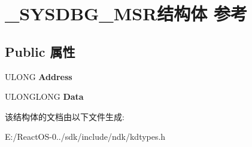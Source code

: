 \hypertarget{struct___s_y_s_d_b_g___m_s_r}{}\section{\+\_\+\+S\+Y\+S\+D\+B\+G\+\_\+\+M\+S\+R结构体 参考}
\label{struct___s_y_s_d_b_g___m_s_r}
\subsection*{Public 属性}
\begin{DoxyCompactItemize}
\item 
\mbox{\label{struct___s_y_s_d_b_g___m_s_r_a9123978c19ec93f080265923069921a0}} 
U\+L\+O\+NG {\bfseries Address}
\item 
\mbox{\label{struct___s_y_s_d_b_g___m_s_r_ad8adef031d34d649103e1ec75ce0b87d}} 
U\+L\+O\+N\+G\+L\+O\+NG {\bfseries Data}
\end{DoxyCompactItemize}


该结构体的文档由以下文件生成\+:\begin{DoxyCompactItemize}
\item 
E\+:/\+React\+O\+S-\/0../sdk/include/ndk/kdtypes.\+h\end{DoxyCompactItemize}
